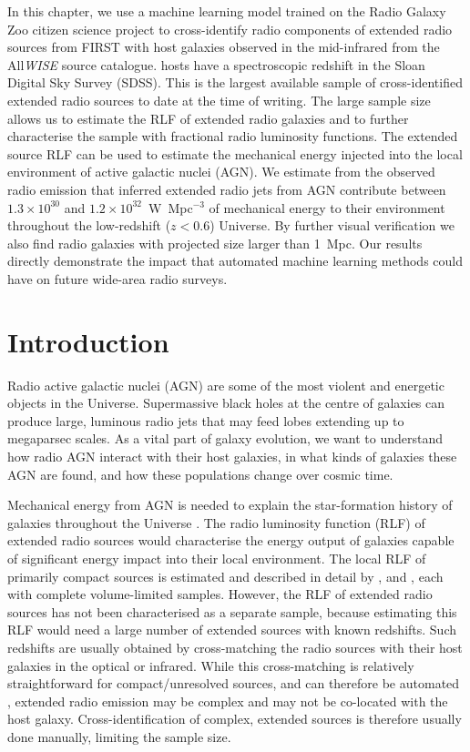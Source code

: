 In this chapter, we use a machine learning model trained on the Radio Galaxy Zoo citizen science project to cross-identify \ncomponents{} radio components of extended radio sources from FIRST with \nsources{} host galaxies observed in the mid-infrared from the All\emph{WISE} source catalogue. \nsourceszsp{} hosts have a spectroscopic redshift in the Sloan Digital Sky Survey (SDSS). This is the largest available sample of cross-identified extended radio sources to date at the time of writing. The large sample size allows us to estimate the RLF of extended radio galaxies and to further characterise the sample with fractional radio luminosity functions. The extended source RLF can be used to estimate the mechanical energy injected into the local environment of active galactic nuclei (AGN). We estimate from the observed radio emission that inferred extended radio jets from AGN contribute between $1.3 \times 10^{30}$ and $1.2 \times 10^{32}$~W~Mpc$^{-3}$ of mechanical energy to their environment throughout the low-redshift ($z < 0.6$) Universe. By further visual verification we also find \nnewgiants{} radio galaxies with projected size larger than 1~Mpc. Our results directly demonstrate the impact that automated machine learning methods could have on future wide-area radio surveys.

\section{Introduction} \label{sec:intro}

Radio active galactic nuclei (AGN) are some of the most violent and energetic
objects in the Universe. Supermassive black holes at the centre of galaxies
can produce large, luminous radio jets that may feed lobes extending up to
megaparsec scales. As a vital part of galaxy evolution, we want to understand
how radio AGN interact with their host galaxies, in what kinds of galaxies
these AGN are found, and how these populations change over cosmic time.

Mechanical energy from AGN is needed to explain the star-formation history of galaxies throughout the Universe \citep[e.g.][]{raouf17agn,hardcastle20feedback}. The radio luminosity function (RLF) of extended radio sources would characterise the energy output of galaxies capable of significant energy impact into their local environment. The local RLF of primarily compact sources is estimated and
described in detail by \citet{mauch07rlf}, \citet{pracy16rlf} and
\citet{condon19rlf}, each with complete volume-limited samples. However, the RLF of extended radio sources has not been
characterised as a separate sample, because estimating this RLF would need a large number of extended sources with known
redshifts. Such redshifts are usually obtained by cross-matching the radio
sources with their host galaxies in the optical or infrared. While this
cross-matching is relatively straightforward for compact/unresolved sources,
and can therefore be automated \citep[e.g.][]{kimball08}, extended radio
emission may be complex and may not be co-located with the host galaxy.
Cross-identification of complex, extended sources is therefore usually done
manually, limiting the sample size.

